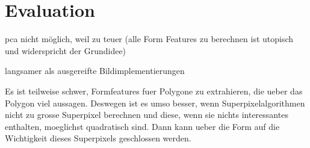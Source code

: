 \chapter{Evaluation}
\label{evaluation}



pca nicht möglich, weil zu teuer (alle Form Features zu berechnen ist utopisch und widerspricht der Grundidee)






langsamer als ausgereifte Bildimplementierungen



Es ist teilweise schwer, Formfeatures fuer Polygone zu extrahieren, die ueber das Polygon viel aussagen. Deswegen ist es umso besser, wenn Superpixelalgorithmen nicht zu grosse Superpixel berechnen und diese, wenn sie nichts interessantes enthalten, moeglichst quadratisch sind. Dann kann ueber die Form auf die Wichtigkeit dieses Superpixels geschlossen werden.
